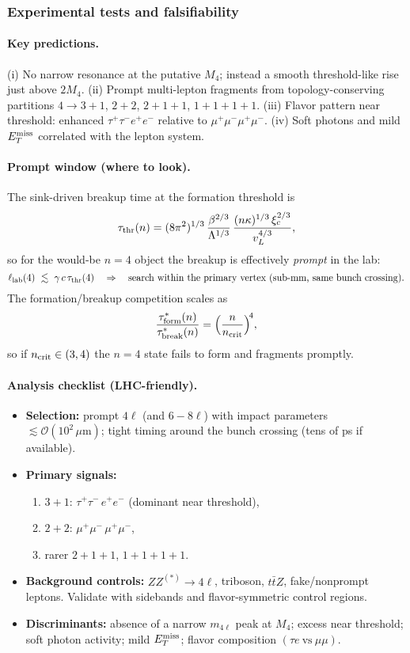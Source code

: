 \subsubsection{Experimental tests and falsifiability}

\paragraph{Key predictions.}
(i) No narrow resonance at the putative \(M_4\); instead a smooth threshold-like rise just above \(2M_4\).
(ii) Prompt multi-lepton fragments from topology-conserving partitions \(4\to 3{+}1\), \(2{+}2\), \(2{+}1{+}1\), \(1{+}1{+}1{+}1\).
(iii) Flavor pattern near threshold: enhanced \(\tau^+\tau^- e^+e^-\) relative to \(\mu^+\mu^-\mu^+\mu^-\).
(iv) Soft photons and mild \(E_T^{\rm miss}\) correlated with the lepton system.

\paragraph{Prompt window (where to look).}
The sink-driven breakup time at the formation threshold is
\[
\tau_{\rm thr}(n)= (8\pi^2)^{1/3}\,\frac{\beta^{2/3}}{\Lambda^{1/3}}\,\frac{(n\kappa)^{1/3}\,\xi_c^{2/3}}{v_L^{4/3}},
\]
so for the would-be \(n{=}4\) object the breakup is effectively \emph{prompt} in the lab:
\[
\ell_{\rm lab}(4)\ \lesssim\ \gamma\,c\,\tau_{\rm thr}(4)\quad\Rightarrow\quad
\text{search within the primary vertex (sub-mm, same bunch crossing).}
\]
The formation/breakup competition scales as
\[
\frac{\tau_{\rm form}^*(n)}{\tau_{\rm break}^*(n)}=\Big(\frac{n}{n_{\rm crit}}\Big)^{\!4},
\]
so if \(n_{\rm crit}\in(3,4)\) the \(n{=}4\) state fails to form and fragments promptly.

\paragraph{Analysis checklist (LHC-friendly).}
\begin{itemize}
  \item \textbf{Selection:} prompt \(4\ell\) (and \(6\!-\!8\ell\)) with impact parameters \(\lesssim\mathcal O(10^2\,\mu\mathrm m)\); tight timing around the bunch crossing (tens of ps if available).
  \item \textbf{Primary signals:}
    \begin{enumerate}
      \item \(3{+}1\): \(\tau^+\tau^-\,e^+e^-\) (dominant near threshold),
      \item \(2{+}2\): \(\mu^+\mu^-\,\mu^+\mu^-\),
      \item rarer \(2{+}1{+}1\), \(1{+}1{+}1{+}1\).
    \end{enumerate}
  \item \textbf{Background controls:} \(ZZ^{(*)}\!\to4\ell\), triboson, \(t\bar t Z\), fake/nonprompt leptons. Validate with sidebands and flavor-symmetric control regions.
  \item \textbf{Discriminants:} absence of a narrow \(m_{4\ell}\) peak at \(M_4\); excess near threshold; soft photon activity; mild \(E_T^{\rm miss}\); flavor composition $(\tau e\ \text{vs}\ \mu\mu)$.
\end{itemize}

